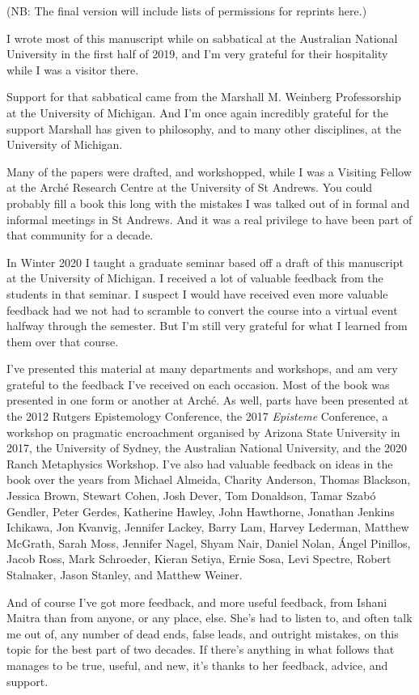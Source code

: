 \documentclass[
  12pt,
  letterpaper,
]{scrbook}
\begin{document}
(NB: The final version will include lists of permissions for reprints
here.)

I wrote most of this manuscript while on sabbatical at the Australian
National University in the first half of 2019, and I'm very grateful for
their hospitality while I was a visitor there.

Support for that sabbatical came from the Marshall M. Weinberg
Professorship at the University of Michigan. And I'm once again
incredibly grateful for the support Marshall has given to philosophy,
and to many other disciplines, at the University of Michigan.

Many of the papers were drafted, and workshopped, while I was a Visiting
Fellow at the Arché Research Centre at the University of St Andrews. You
could probably fill a book this long with the mistakes I was talked out
of in formal and informal meetings in St Andrews. And it was a real
privilege to have been part of that community for a decade.

In Winter 2020 I taught a graduate seminar based off a draft of this
manuscript at the University of Michigan. I received a lot of valuable
feedback from the students in that seminar. I suspect I would have
received even more valuable feedback had we not had to scramble to
convert the course into a virtual event halfway through the semester.
But I'm still very grateful for what I learned from them over that
course.

I've presented this material at many departments and workshops, and am
very grateful to the feedback I've received on each occasion. Most of
the book was presented in one form or another at Arché. As well, parts
have been presented at the 2012 Rutgers Epistemology Conference, the
2017 \emph{Episteme} Conference, a workshop on pragmatic encroachment
organised by Arizona State University in 2017, the University of Sydney,
the Australian National University, and the 2020 Ranch Metaphysics
Workshop. I've also had valuable feedback on ideas in the book over the
years from Michael Almeida, Charity Anderson, Thomas Blackson, Jessica
Brown, Stewart Cohen, Josh Dever, Tom Donaldson, Tamar Szabó Gendler,
Peter Gerdes, Katherine Hawley, John Hawthorne, Jonathan Jenkins
Ichikawa, Jon Kvanvig, Jennifer Lackey, Barry Lam, Harvey Lederman,
Matthew McGrath, Sarah Moss, Jennifer Nagel, Shyam Nair, Daniel Nolan,
Ángel Pinillos, Jacob Ross, Mark Schroeder, Kieran Setiya, Ernie Sosa,
Levi Spectre, Robert Stalnaker, Jason Stanley, and Matthew Weiner.

And of course I've got more feedback, and more useful feedback, from
Ishani Maitra than from anyone, or any place, else. She's had to listen
to, and often talk me out of, any number of dead ends, false leads, and
outright mistakes, on this topic for the best part of two decades. If
there's anything in what follows that manages to be true, useful, and
new, it's thanks to her feedback, advice, and support.
\end{document}
